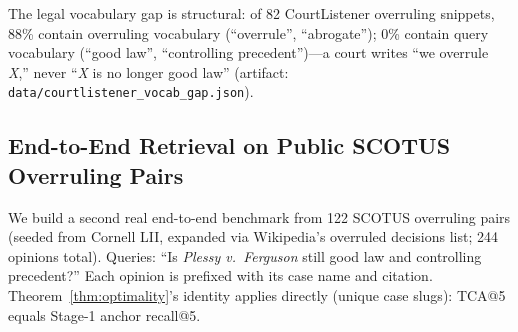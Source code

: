 \documentclass[11pt]{article}
\begin{document}
The legal vocabulary gap is structural: of 82 CourtListener overruling snippets, 88\% contain overruling vocabulary (``overrule'', ``abrogate''); 0\% contain query vocabulary (``good law'', ``controlling precedent'')---a court writes ``we overrule \emph{X},'' never ``\emph{X} is no longer good law'' (artifact: \texttt{data/courtlistener\_vocab\_gap.json}).

\subsection{End-to-End Retrieval on Public SCOTUS Overruling Pairs}
\label{sec:legal_realworld}

We build a second real end-to-end benchmark from 122 SCOTUS overruling pairs (seeded from Cornell LII, expanded via Wikipedia's overruled decisions list; 244 opinions total). Queries: ``Is \emph{Plessy v.\ Ferguson} still good law and controlling precedent?'' Each opinion is prefixed with its case name and citation. Theorem~\ref{thm:optimality}'s identity applies directly (unique case slugs): TCA@5 equals Stage-1 anchor recall@5.

\begin{table}[h]
\centering
\small
{}
\caption{End-to-end retrieval on 122 public SCOTUS overruling pairs (244-opinion corpus). BM25 direct achieves 0.893 [0.826, 0.936] because overruling opinions explicitly cite the case they overrule; Dense direct fails (0.172 [0.115, 0.249]) because semantic similarity prefers the original opinion. Two-Stage (Dense anchor) achieves 0.926 [0.865, 0.961]---the CIs of BM25 and Two-Stage overlap (n=122 is underpowered to distinguish the +3.3~pp gap). SCOTUS is the easiest domain for BM25: explicit citation vocabulary bridges the lexical gap. The hard structural failure is Dense (0.172), where semantic similarity actively misdirects. Artifacts: \texttt{data/legal\_scotus\_expanded\_pairs.json}, \texttt{data/legal\_scotus\_expanded\_results.json}.}
\label{tab:legal_realworld}
\end{table}
\end{document}
